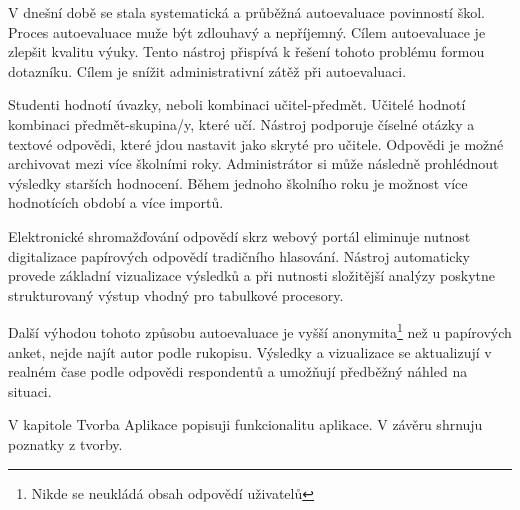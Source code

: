 V dnešní době se stala systematická a průběžná autoevaluace povinností škol.
Proces autoevaluace muže být zdlouhavý a nepříjemný. Cílem autoevaluace je zlepšit kvalitu výuky.\cite{sbornik-autoevaluace} 
Tento nástroj přispívá k řešení tohoto problému formou dotazníku.
Cílem je snížit administrativní zátěž při autoevaluaci.

Studenti hodnotí úvazky, neboli kombinaci učitel-předmět. 
Učitelé hodnotí kombinaci předmět-skupina/y, které učí. 
Nástroj podporuje číselné otázky a textové odpovědi, které jdou nastavit jako skryté pro učitele.
Odpovědi je možné archivovat mezi více školními roky. Administrátor si může následně prohlédnout výsledky starších hodnocení. 
Během jednoho školního roku je možnost více hodnotících období a více importů.

Elektronické shromažďování odpovědí skrz webový portál eliminuje nutnost digitalizace papírových odpovědí tradičního hlasování. 
Nástroj automaticky provede základní vizualizace výsledků a při nutnosti složitější analýzy poskytne strukturovaný výstup vhodný pro tabulkové procesory.

Další výhodou tohoto způsobu autoevaluace je vyšší anonymita\footnote{Nikde se neukládá obsah odpovědí uživatelů} než u papírových anket, nejde najít autor podle rukopisu. 
Výsledky a vizualizace se aktualizují v realném čase podle odpovědi respondentů a umožňují předběžný náhled na situaci.

V kapitole Tvorba Aplikace popisuji funkcionalitu aplikace. V závěru shrnuju poznatky z tvorby.
